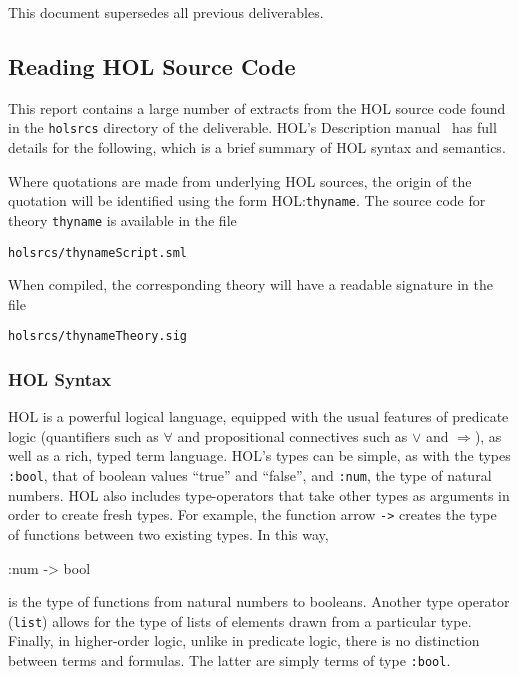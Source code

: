 \documentclass[11pt]{article}
\newcommand{\HOLfile}[1]{HOL:\texttt{#1}}
\begin{document}
\vspace{1ex}
\noindent This document supersedes all previous deliverables.

\subsection{Reading  HOL Source Code}
\label{sec:reading-HOL}

This report contains a large number of extracts from the HOL source
code found in the \texttt{holsrcs} directory of the deliverable.
HOL's Description manual~\cite{HOLdescription} has full details for
the following, which is a brief summary of HOL syntax and semantics.

Where quotations are made from underlying HOL sources, the origin of
the quotation will be identified using the form \HOLfile{thyname}.
The source code for theory \texttt{thyname} is available in the file
\begin{alltt}
   holsrcs/thynameScript.sml
\end{alltt}
When compiled, the corresponding theory will have a readable
signature in the file
\begin{alltt}
   holsrcs/thynameTheory.sig
\end{alltt}


\subsubsection{HOL Syntax}

HOL is a powerful logical language, equipped with the usual features
of predicate logic (quantifiers such as $\forall$ and propositional
connectives such as $\lor$ and $\Rightarrow$), as well as a rich,
typed term language.  HOL's types can be simple, as with the types
\texttt{:bool}, that of boolean values ``true'' and ``false'', and
\texttt{:num}, the type of natural numbers.  HOL also includes
type-operators that take other types as arguments in order to create
fresh types.  For example, the function arrow \texttt{->} creates the
type of functions between two existing types.  In this way,
\begin{stdrule}
   :num -> bool
\end{stdrule}
is the type of functions from natural numbers to booleans.  Another
type operator (\texttt{list}) allows for the type of lists of elements
drawn from a particular type.  Finally, in higher-order logic, unlike
in predicate logic, there is no distinction between terms and
formulas.  The latter are simply terms of type \texttt{:bool}.
\end{document}
